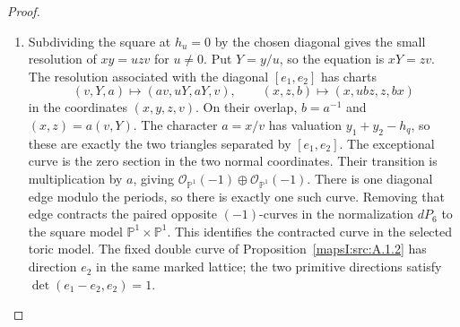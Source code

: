 \begin{proof}
\begin{enumerate}[label=\arabic*.,leftmargin=*]
\item Subdividing the square at $h_u=0$ by the chosen diagonal gives
the small resolution of $xy=uzv$ for $u\ne0$. Put $Y=y/u$, so the equation is $xY=zv$.
The resolution associated with the diagonal $[e_1,e_2]$ has charts
\[
 (v,Y,a)\longmapsto(av,uY,aY,v),\qquad
 (x,z,b)\longmapsto(x,ubz,z,bx)
\]
in the coordinates $(x,y,z,v)$. On their overlap,
$b=a^{-1}$ and $(x,z)=a(v,Y)$. The character $a=x/v$ has
valuation $y_1+y_2-h_q$, so these are exactly the two triangles
separated by $[e_1,e_2]$. The exceptional curve is the zero
section in the two normal coordinates. Their transition is
multiplication by $a$, giving
$\mathcal O_{\mathbb P^1}(-1)\oplus\mathcal O_{\mathbb P^1}(-1)$. There is one
diagonal edge modulo the periods, so there is exactly one such
curve. Removing that edge contracts the paired opposite
$(-1)$-curves in the normalization $dP_6$ to the square model
$\mathbb P^1\times\mathbb P^1$. This identifies the contracted
curve in the selected toric model. The fixed double curve of
Proposition~\ref{mapsI:src:A.1.2} has direction $e_2$ in the same
marked lattice; the two primitive directions satisfy
$\det(e_1-e_2,e_2)=1$.
\end{enumerate}
\end{proof}
